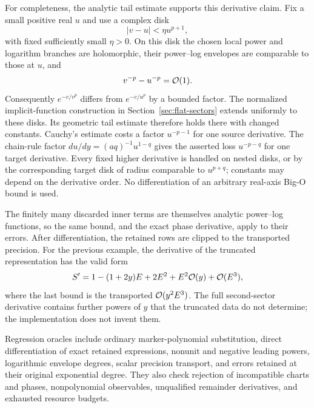 For completeness, the analytic tail estimate supports this derivative
claim. Fix a small positive real $u$ and use a complex disk
\[
 |v-u|<\eta u^{p+1},
\]
with fixed sufficiently small $\eta>0$. On this disk the chosen local
power and logarithm branches are holomorphic, their power--log envelopes
are comparable to those at $u$, and
\[
 v^{-p}-u^{-p}=\mathcal O(1).
\]
Consequently $e^{-c/v^p}$ differs from $e^{-c/u^p}$ by a bounded factor.
The normalized implicit-function construction in
Section~\ref{sec:flat-sectors} extends uniformly to these disks. Its
geometric tail estimate therefore holds there with changed constants.
Cauchy's estimate costs a factor $u^{-p-1}$ for one source derivative.
The chain-rule factor $du/dy=(a q)^{-1}u^{1-q}$ gives the asserted loss
$u^{-p-q}$ for one target derivative. Every fixed higher derivative is
handled on nested disks, or by the corresponding target disk of radius
comparable to $u^{p+q}$; constants may depend on the derivative order.
No differentiation of an arbitrary real-axis Big-O bound is used.

The finitely many discarded inner terms are themselves analytic
power--log functions, so the same bound, and the exact phase derivative,
apply to their errors. After differentiation, the retained rows are clipped
to the transported precision. For the previous example, the derivative
of the truncated representation has the valid form
\[
 S'=1-(1+2y)E+2E^2+E^2\mathcal O(y)+\mathcal O(E^3),
\]
where the last bound is the transported $\mathcal O(y^2E^3)$.
The full second-sector derivative contains further powers of $y$ that the
truncated data do not determine; the implementation does not invent them.

Regression oracles include ordinary marker-polynomial substitution,
direct differentiation of exact retained expressions, nonunit and negative
leading powers, logarithmic envelope degrees, scalar precision transport,
and errors retained at their original exponential degree. They also check
rejection of incompatible charts and phases, nonpolynomial observables,
unqualified remainder derivatives, and exhausted resource budgets.
